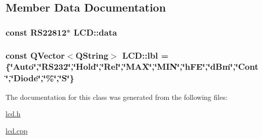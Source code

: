 \subsection{Member Data Documentation}
\hypertarget{class_l_c_d_a04c1fe4d60f692978d1d428521e2d2a2}{
\subsubsection[{data}]{\setlength{\rightskip}{0pt plus 5cm}const {\bf R\-S22812}$\ast$ L\-C\-D\-::data\hspace{0.3cm}{\ttfamily [private]}}}\label{class_l_c_d_a04c1fe4d60f692978d1d428521e2d2a2}
\hypertarget{class_l_c_d_a80e55f48f0e7c7b791fe1602640f708a}{
\subsubsection[{lbl}]{\setlength{\rightskip}{0pt plus 5cm}const Q\-Vector$<$Q\-String$>$ L\-C\-D\-::lbl =\{\char`\"{}Auto\char`\"{},\char`\"{}R\-S232\char`\"{},\char`\"{}Hold\char`\"{},\char`\"{}Rel\char`\"{},\char`\"{}M\-A\-X\char`\"{},\char`\"{}M\-I\-N\char`\"{},\char`\"{}h\-F\-E\char`\"{},\char`\"{}d\-Bm\char`\"{},\char`\"{}Cont\char`\"{},\char`\"{}Diode\char`\"{},\char`\"{}\%\char`\"{},\char`\"{}S\char`\"{}\}\hspace{0.3cm}{\ttfamily [private]}}}\label{class_l_c_d_a80e55f48f0e7c7b791fe1602640f708a}


The documentation for this class was generated from the following files\-:\begin{DoxyCompactItemize}
\item 
\hyperlink{lcd_8h}{lcd.\-h}\item 
\hyperlink{lcd_8cpp}{lcd.\-cpp}\end{DoxyCompactItemize}
